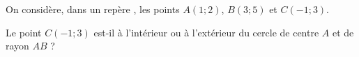 
On considère, dans un repère \Oij, les points $A(1;2)$, $B(3;5)$ et $C(-1;3)$. 

Le point $C(-1;3)$ est-il à l'intérieur ou à l'extérieur du cercle de centre $A$ et de rayon $AB$ ? 